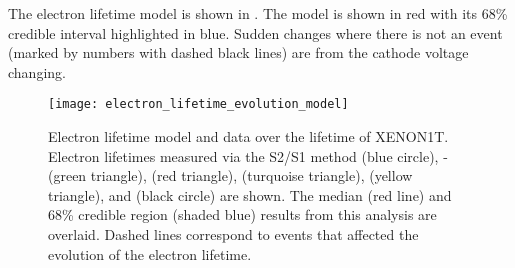 \bgroup
\def\arraystretch{1.2}
\begin{table}
\centering
{}
\caption{Impurity spikes in XENON1T.  Relevant information along with the medians and 68\% credible intervals are listed.  Values with a
$^{\ast}$ have a period of days to weeks following where no electron lifetime measurements exist so have a larger uncertainty.}
\label{tab:electron_lifetime_model_detector_effects_spikes_dates}
\end{table}
\egroup

The electron lifetime model is shown in .  The model is shown in red with its 68\% credible
interval highlighted in blue.  Sudden changes where there is not an event (marked by numbers with dashed black lines) are from the cathode
voltage changing.

\begin{figure}
\centering
\texttt{[image: electron\_lifetime\_evolution\_model]}
\caption[Electron lifetime model median and 68\% credible region over the lifetime of XENON1T.  Electron lifetime measurements are also
shown.]{Electron lifetime model and data over the lifetime of XENON1T.  Electron lifetimes measured via the S2/S1 method (blue circle),
- (green triangle),  (red triangle),  (turquoise triangle),  (yellow
triangle), and \metakr (black circle) are shown.  The median (red line) and 68\% credible region (shaded blue) results from this analysis are
overlaid.  Dashed lines correspond to events that affected the evolution of the electron lifetime.}
\label{fig:elifetime_fit_results_elifetime}
\end{figure}


